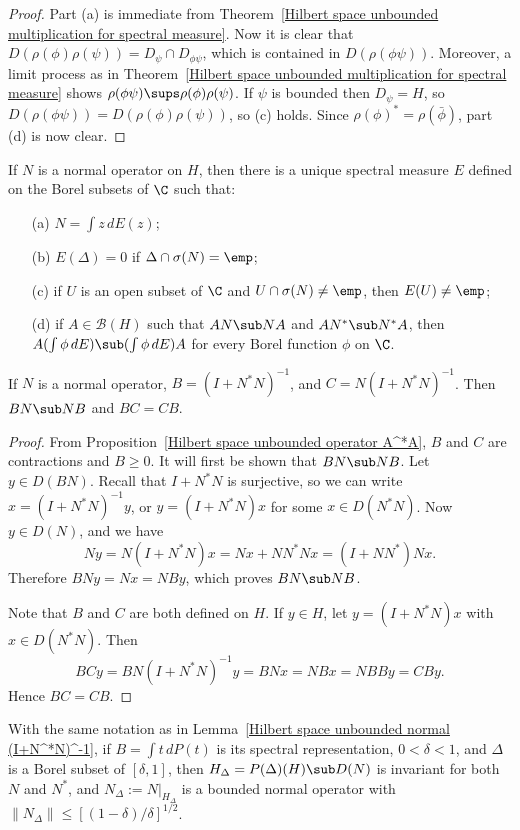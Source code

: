 \begin{proof}
Part (a) is immediate from Theorem~\ref{Hilbert space unbounded multiplication for spectral measure}. Now it is clear that $D(\rho(\phi)\rho(\psi))=D_{\psi}\cap D_{\phi\psi}$, which is contained in $D(\rho(\phi\psi))$. Moreover, a limit process as in Theorem~\ref{Hilbert space unbounded multiplication for spectral measure} shows $\rho(\phi\psi)\sups\rho(\phi)\rho(\psi)$. If $\psi$ is bounded then $D_\psi=H$, so $D(\rho(\phi\psi))=D(\rho(\phi)\rho(\psi))$, so (c) holds. Since $\rho(\phi)^*=\rho(\bar{\phi})$, part (d) is now clear.
\end{proof}
\begin{theorem}\label{spectral theorem unbounded}
If $N$ is a normal operator on $H$, then there is a unique spectral measure $E$ defined on the Borel subsets of $\C$ such that:
\begin{itemize}
\item[(a)] $N=\int z\,dE(z)$;
\item[(b)] $E(\Delta)=0$ if $\Delta\cap\sigma(N)=\emp$;
\item[(c)] if $U$ is an open subset of $\C$ and $U\cap\sigma(N)\neq\emp$, then $E(U)\neq\emp$;
\item[(d)] if $A\in\mathcal{B}(H)$ such that $AN\sub NA$ and $AN^*\sub N^*A$, then $A(\int\phi\,dE)\sub(\int\phi\,dE)A$ for every Borel function $\phi$ on $\C$. 
\end{itemize}
\end{theorem}
\begin{lemma}\label{Hilbert space unbounded normal (I+N^*N)^-1}
If $N$ is a normal operator, $B=(I+N^*N)^{-1}$, and $C=N(I+N^*N)^{-1}$. Then $BN\sub NB$ and $BC=CB$.
\end{lemma}
\begin{proof}
From Proposition~\ref{Hilbert space unbounded operator A^*A}, $B$ and $C$ are contractions and $B\geq 0$. It will first be shown that $BN\sub NB$. Let $y\in D(BN)$. Recall that $I+N^*N$ is surjective, so we can write $x=(I+N^*N)^{-1}y$, or $y=(I+N^*N)x$ for some $x\in D(N^*N)$. Now $y\in D(N)$, and we have
\[Ny=N(I+N^*N)x=Nx+NN^*Nx=(I+NN^*)Nx.\]
Therefore $BNy=Nx=NBy$, which proves $BN\sub NB$.\par
Note that $B$ and $C$ are both defined on $H$. If $y\in H$, let $y=(I+N^*N)x$ with $x\in D(N^*N)$. Then 
\[BCy=BN(I+N^*N)^{-1}y=BNx=NBx=NBBy=CBy.\]
Hence $BC=CB$.
\end{proof}
\begin{lemma}\label{Hilbert space spectral of (I+N^*N)^-1}
With the same notation as in Lemma~\ref{Hilbert space unbounded normal (I+N^*N)^-1}, if $B=\int t\,dP(t)$ is its spectral representation, $0<\delta<1$, and $\Delta$ is a Borel subset of $[\delta,1]$, then $H_\Delta=P(\Delta)(H)\sub D(N)$ is invariant for both $N$ and $N^*$, and $N_\Delta:=N|_{H_\Delta}$ is a bounded normal operator with $\|N_\Delta\|\leq[(1-\delta)/\delta]^{1/2}$.
\end{lemma}
